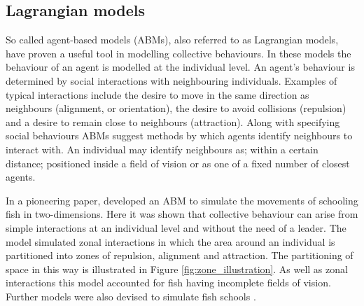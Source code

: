 \subsection{Lagrangian models}
\label{ssec:lagrangian_models}

So called agent-based models (ABMs), also referred to as Lagrangian models, have proven a useful tool in modelling collective behaviours. In these models the behaviour of an agent is modelled at the individual level. An agent's behaviour is determined by social interactions with neighbouring individuals. Examples of typical interactions include the desire to move in the same direction as neighbours (alignment, or orientation), the desire to avoid collisions (repulsion) and a desire to remain close to neighbours (attraction). Along with specifying social behaviours ABMs suggest methods by which agents identify neighbours to interact with. An individual may identify neighbours as; within a certain distance; positioned inside a field of vision or as one of a fixed number of closest agents.

In a pioneering paper, \citet{aoki82} developed an ABM to simulate the movements of schooling fish in two-dimensions. Here it was shown that collective behaviour can arise from simple interactions at an individual level and without the need of a leader. The model simulated zonal interactions in which the area around an individual is partitioned into zones of repulsion, alignment and attraction. The partitioning of space in this way is illustrated in Figure \ref{fig:zone_illustration}. As well as zonal interactions this model accounted for fish having incomplete fields of vision. Further models were also devised to simulate fish schools \citep{okubo86, huth92}.

